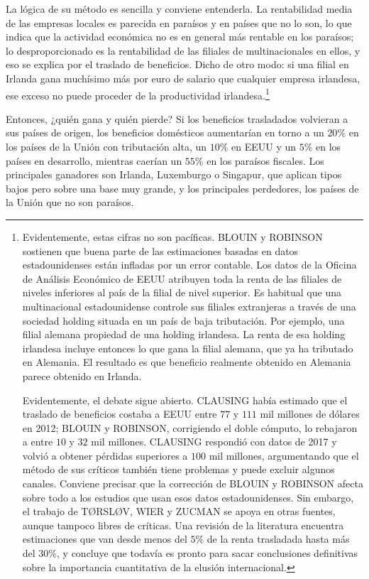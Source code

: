 \documentclass[10pt,a4paper]{article}
\begin{document}
La lógica de su método es sencilla y conviene entenderla. La rentabilidad media de las empresas locales es parecida en paraísos y en países que no lo son, lo que indica que la actividad económica no es en general más rentable en los paraísos; lo desproporcionado es la rentabilidad de las filiales de multinacionales en ellos, y eso se explica por el traslado de beneficios. Dicho de otro modo: si una filial en Irlanda gana muchísimo más por euro de salario que cualquier empresa irlandesa, ese exceso no puede proceder de la productividad irlandesa.\footnote{%
    Evidentemente, estas cifras no son pacíficas. BLOUIN y ROBINSON sostienen que buena parte de las estimaciones basadas en datos estadounidenses están infladas por un error contable. Los datos de la Oficina de Análisis Económico de EEUU atribuyen toda la renta de las filiales de niveles inferiores al país de la filial de nivel superior. Es habitual que una multinacional estadounidense controle sus filiales extranjeras a través de una sociedad holding situada en un país de baja tributación. Por ejemplo, una filial alemana propiedad de una holding irlandesa. La renta de esa holding irlandesa incluye entonces lo que gana la filial alemana, que ya ha tributado en Alemania. El resultado es que beneficio realmente obtenido en Alemania parece obtenido en Irlanda. 

Evidentemente, el debate sigue abierto. CLAUSING había estimado que el traslado de beneficios costaba a EEUU entre $77$ y $111$ mil millones de dólares en 2012; BLOUIN y ROBINSON, corrigiendo el doble cómputo, lo rebajaron a entre $10$ y $32$ mil millones. CLAUSING respondió con datos de 2017 y volvió a obtener pérdidas superiores a $100$ mil millones, argumentando que el método de sus críticos también tiene problemas y puede excluir algunos canales. Conviene precisar que la corrección de BLOUIN y ROBINSON afecta sobre todo a los estudios que usan esos datos estadounidenses. Sin embargo, el trabajo de TØRSLØV, WIER y ZUCMAN se apoya en otras fuentes, aunque tampoco libres de críticas. Una revisión de la literatura encuentra estimaciones que van desde menos del $5\%$ de la renta trasladada hasta más del $30\%$, y concluye que todavía es pronto para sacar conclusiones definitivas sobre la importancia cuantitativa de la elusión internacional.
}

Entonces, ¿quién gana y quién pierde? Si los beneficios trasladados volvieran a sus países de origen, los beneficios domésticos aumentarían en torno a un $20\%$ en los países de la Unión con tributación alta, un $10\%$ en EEUU y un $5\%$ en los países en desarrollo, mientras caerían un $55\%$ en los paraísos fiscales. Los principales ganadores son Irlanda, Luxemburgo o Singapur, que aplican tipos bajos pero sobre una base muy grande, y los principales perdedores, los países de la Unión que no son paraísos.
\end{document}
